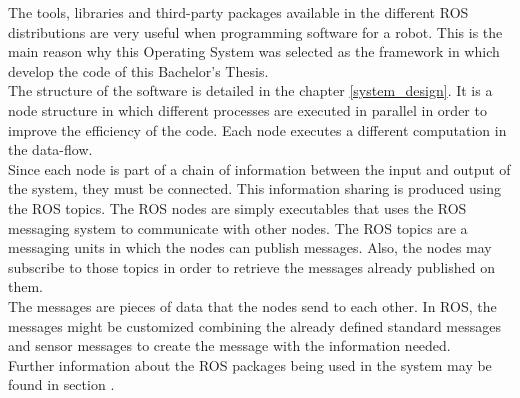 	The tools, libraries and third-party packages available in the different ROS distributions are very useful when programming software for a robot. This is the main reason why this Operating System was selected as the framework in which develop the code of this Bachelor's Thesis. 
	\\
	The structure of the software is detailed in the chapter \ref{system_design}.  It is a node structure in which different processes are executed in parallel in order to improve the efficiency of the code. Each node executes a different computation in the data-flow. 
	\\
	Since each node is part of a chain of information between the input and output of the system, they must be connected. This information sharing is produced using the ROS topics. 
	The ROS nodes are simply executables that uses the ROS messaging system to communicate with other nodes. The ROS topics are a messaging units in which the nodes can publish messages. Also, the nodes may subscribe to those topics in order to retrieve the messages already published on them. 
	\\
	The messages are pieces of data that the nodes send to each other. In ROS, the messages might be customized combining the already defined standard messages and sensor messages to create the message with the information needed. 
	\\

	Further information about the ROS packages being used in the system may be found in section \label{ros_packages}.





